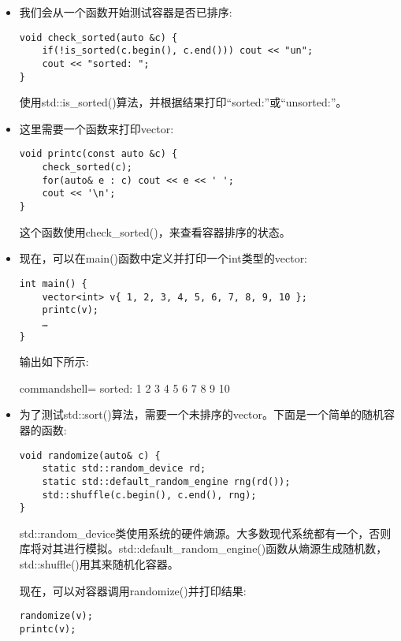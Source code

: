 \begin{itemize}
\item 
我们会从一个函数开始测试容器是否已排序:

\begin{lstlisting}[style=styleCXX]
void check_sorted(auto &c) {
	if(!is_sorted(c.begin(), c.end())) cout << "un";
	cout << "sorted: ";
}
\end{lstlisting}

使用std::is\_sorted()算法，并根据结果打印“sorted:”或“unsorted:”。

\item 
这里需要一个函数来打印vector:

\begin{lstlisting}[style=styleCXX]
void printc(const auto &c) {
	check_sorted(c);
	for(auto& e : c) cout << e << ' ';
	cout << '\n';
}
\end{lstlisting}

这个函数使用check\_sorted()，来查看容器排序的状态。

\item 
现在，可以在main()函数中定义并打印一个int类型的vector:

\begin{lstlisting}[style=styleCXX]
int main() {
	vector<int> v{ 1, 2, 3, 4, 5, 6, 7, 8, 9, 10 };
	printc(v);
	…
}
\end{lstlisting}

输出如下所示:

\begin{tcblisting}{commandshell={}}
sorted: 1 2 3 4 5 6 7 8 9 10
\end{tcblisting}

\item 
为了测试std::sort()算法，需要一个未排序的vector。下面是一个简单的随机容器的函数:

\begin{lstlisting}[style=styleCXX]
void randomize(auto& c) {
	static std::random_device rd;
	static std::default_random_engine rng(rd());
	std::shuffle(c.begin(), c.end(), rng);
}
\end{lstlisting}

std::random\_device类使用系统的硬件熵源。大多数现代系统都有一个，否则库将对其进行模拟。std::default\_random\_engine()函数从熵源生成随机数，std::shuffle()用其来随机化容器。

现在，可以对容器调用randomize()并打印结果:

\begin{lstlisting}[style=styleCXX]
randomize(v);
printc(v);
\end{lstlisting}


\end{itemize}
